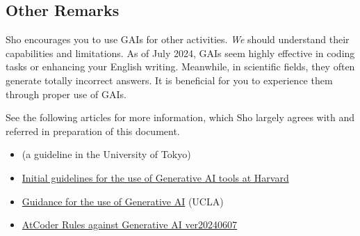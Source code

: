 \documentclass[11pt,pdfa,lastpage,minititle]{MishoNote}
\begin{document}
\subsection*{Other Remarks}
Sho encourages you to use GAIs for other activities.
\emph{We} should understand their capabilities and limitations.
As of July 2024, GAIs seem highly effective in coding tasks or enhancing your English writing.
Meanwhile, in scientific fields, they often generate totally incorrect answers.
It is beneficial for you to experience them through proper use of GAIs.

See the following articles for more information, which Sho largely agrees with and referred in preparation of this document.
\begin{itemize}
 \item \href{https://utelecon.adm.u-tokyo.ac.jp/docs/ai-tools-in-classes}{} (a guideline in the University of Tokyo)
 \item \href{https://huit.harvard.edu/ai/guidelines}{Initial guidelines for the use of Generative AI tools at Harvard}
 \item \href{https://teaching.ucla.edu/resources/ai_guidance/}{Guidance for the use of Generative AI} (UCLA)
 \item \href{https://info.atcoder.jp/entry/llm-abc-rules-en}{AtCoder Rules against Generative AI ver20240607}
\end{itemize}
\end{document}
